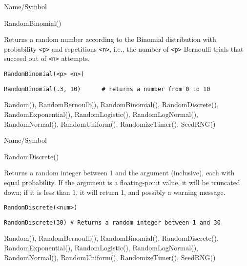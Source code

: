 \rl


\begin{desc}{Name/Symbol}
\item[Name/Symbol]	RandomBinomial()

\item[Description]	Returns a random number according to the Binomial distribution 
		with probability \verb+<p>+ and repetitions \verb+<n>+, i.e., the number of 
		\verb+<p>+ Bernoulli trials that succeed out of \verb+<n>+ attempts.

\item[Usage]		
\begin{verbatim}
RandomBinomial(<p> <n>)  
\end{verbatim}

\item[Example]	
\begin{verbatim}
RandomBinomial(.3, 10)		# returns a number from 0 to 10
\end{verbatim}

\item[See Also]	Random(), RandomBernoulli(), RandomBinomial(),
		RandomDiscrete(), RandomExponential(), RandomLogistic(),
		RandomLogNormal(), RandomNormal(), RandomUniform(),    
		RandomizeTimer(), SeedRNG()    
\end{desc}

\rl


\begin{desc}{Name/Symbol}
\item[Name/Symbol]	RandomDiscrete()

\item[Description]	Returns a random integer between 1 and the argument 
		(inclusive), each with equal probability.  If the argument is 
		a floating-point value, it will be truncated down; if it is 
		less than 1, it will return 1, and possibly a warning message. 

\item[Usage]		
\begin{verbatim}
RandomDiscrete(<num>)
\end{verbatim}
         
\item[Example]	
\begin{verbatim}
RandomDiscrete(30) # Returns a random integer between 1 and 30
\end{verbatim}

\item[See Also]	Random(), RandomBernoulli(), RandomBinomial(), 
		RandomDiscrete(), RandomExponential(), RandomLogistic(),
		RandomLogNormal(), RandomNormal(), RandomUniform(),
		RandomizeTimer(), SeedRNG()    
\end{desc}

